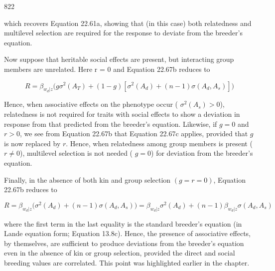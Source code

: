 \documentclass{article}
\begin{document}
822

which recovers Equation 22.61a, showing that (in this case) both relatedness and multilevel selection are required for the response to deviate from the breeder’s equation.

Now suppose that heritable social effects are present, but interacting group members are unrelated. Here r = 0 and Equation 22.67b reduces to

\begin{equation}
R=\beta_{w_{d}|z}\Biggl(g\sigma^{2}(A_{T})+(1-g)\left[\sigma^{2}(A_{d})+(n-1)\sigma(A_{d},A_{s})\right]\Biggr)
\tag{22.67c}
\label{eq:22_67c}
\end{equation}

Hence, when associative effects on the phenotype occur ( $ \sigma^2(A_s) > 0 $), relatedness is not required for traits with social effects to show a deviation in response from that predicted from the breeder's equation. Likewise, if  $ g = 0 $ and  $ r > 0 $, we see from Equation 22.67b that Equation 22.67c applies, provided that  $ g $ is now replaced by  $ r $. Hence, when relatedness among group members is present ( $ r \neq 0 $), multilevel selection is not needed ( $ g = 0 $) for deviation from the breeder's equation.

Finally, in the absence of both kin and group selection  $ (g = r = 0) $, Equation 22.67b reduces to

\begin{equation}
R=\beta_{w_{d}|z}\Biggl(\sigma^{2}(A_{d})+(n-1)\sigma(A_{d},A_{s})\Biggr)=\beta_{w_{d}|z}\sigma^{2}(A_{d})+(n-1)\beta_{w_{d}|z}\sigma(A_{d},A_{s})
\tag{22.67d}
\label{eq:22_67d}
\end{equation}

where the first term in the last equality is the standard breeder's equation (in Lande equation form; Equation 13.8c). Hence, the presence of associative effects, by themselves, are sufficient to produce deviations from the breeder's equation even in the absence of kin or group selection, provided the direct and social breeding values are correlated. This point was highlighted earlier in the chapter.
\end{document}
